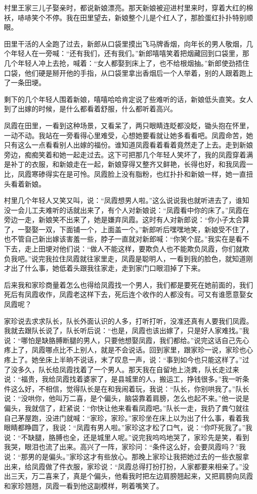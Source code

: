 \documentclass[12pt,UTF8]{ctexbook}
\begin{document}
村里王家三儿子娶亲时，都说新娘漂亮。那天新娘被迎进村里来时，穿着大红的棉袄，哧哧笑个不停。我在田里望去，新娘整个儿是个红人了，那脸蛋红扑扑特别顺眼。

田里干活的人全跑了过去，新郎从口袋里摸出飞马牌香烟，向年长的男人敬烟，几个年轻人在一旁喊：“还有我们，还有我们。”新郎嘻嘻笑着把烟藏回到口袋里，那几个年轻人冲上去抢，喊着：“女人都娶到床上了，也不给根烟抽。”新郎使劲捂住口袋，他们硬是掰开他的手指，从口袋里拿出香烟后一个人举着，别的人跟着跑上了一条田埂。

剩下的几个年轻人围着新娘，嘻嘻哈哈肯定说了些难听的话，新娘低头直笑。女人到了出嫁的时候，是什么都看着舒服，什么都听着高兴。

凤霞在田里，一看到这种场景，又看呆了，两只眼睛连眨都没眨，锄头抱在怀里，一动不动。我站在一旁看得心里难受，心想她要看就让她多看看吧。凤霞命苦，她只有这么一点看看别人出嫁的福份。谁知道凤霞看着看着竟然走了上去。走到新娘旁边，痴痴笑着和她一起走过去。这下可把那几个年轻人笑坏了，我的凤霞穿着满是补丁的衣服，和新娘走在一起，新娘穿得又整齐又鲜艳，长得也好，和我凤霞一比，凤霞寒碜得实在是可怜。凤霞脸上没有脂粉，也红扑扑和新娘一样，她一直扭头看着新娘。

村里几个年轻人又笑又叫，说：“凤霞想男人啦。”这么说说我也就听进去了，谁知没一会儿工夫难听的话就出来了，有个人对新娘说：“凤霞看中你的床了。”凤霞在旁边一走，新娘笑不出来了，她是嫌弃凤霞。这时有人对新郎说：“你小子太合算了，一娶娶一双，下面铺一个，上面盖一个。”新郎听后嘿嘿地笑，新娘受不住了，也不管自己新出嫁该害羞一些，脖子一直就对新郎喊：“你笑个屁。”我实在是看不下去，走上田埂对他们说：“做人不能这样，要欺负人也不能欺负凤霞，你们就欺负我吧。”说完我拉住凤霞就往家里走，凤霞是聪明人，一看到我的脸色，就知道刚才出了什么事，她低着头跟我往家走，走到家门口眼泪掉了下来。

后来我和家珍商量着怎么也得给凤霞找一个男人，我们都是要死在她前面的，我们死后有凤霞收作，凤霞老这样下去，死后连个收作的人都没有。可又有谁愿意娶女凤霞呢？

家珍说去求求队长，队长外面认识的人多，打听打听，没准还真有人要我们凤霞。我就去跟队长说了，队长听后说：“也是，凤霞也该出嫁了，只是好人家难找。”我说：“哪怕是缺胳膊断腿的男人，只要他想娶凤霞，我们都给。”说完这话自己先心疼上了，凤霞哪点比不上别人，就是不会说话。回到家里，跟家珍一说，家珍也心疼上了。她坐床上半晌不说话，末了叹息一声，说：“事到如今也只能这样了。”过了没多久，队长给凤霞找着了一个男人。那天我在自留地上浇粪，队长走过来说：“福贵，我给凤霞找着婆家了，是县城里的人，搬运工，挣钱很多。”我一听条件这么好，不相信，觉得队长是在和我闹着玩，我说：“队长，你别哄我了。”队长说：“没哄你，他叫万二喜，是个偏头，脑袋靠着肩膀，怎么也起不来。”他一说是偏头，我就信了，赶紧说：“你快让他来看看凤霞吧。”队长一走，我扔了粪勺就往自己茅屋跑，没进门就喊：“家珍，家珍。”家珍坐在床上以为出了什么事，看着我眼睛都睁圆了，我说：“凤霞有男人啦。”家珍这才松了口气，说：“你吓死我了。”我说：“不缺腿，胳膊也全，还是城里人呢。”说完我呜呜地哭了，家珍先是笑，看到我哭，眼泪也流了出来。高兴了一阵，家珍问：“条件这么好，会要凤霞吗？”我说：“那男的是偏头。”家珍这才有些放心。那晚上家珍让我把她过去的一些衣服拿出来，给凤霞做了件衣服，家珍说：“凤霞总得打扮打扮，人家都要来相亲了。”没出三天，万二喜来了，真是个偏头，他看我时把左边肩膀翘起来，又把肩膀向凤霞和家珍翘翘，凤霞一看到他这副模样，咧着嘴笑了。
\end{document}
